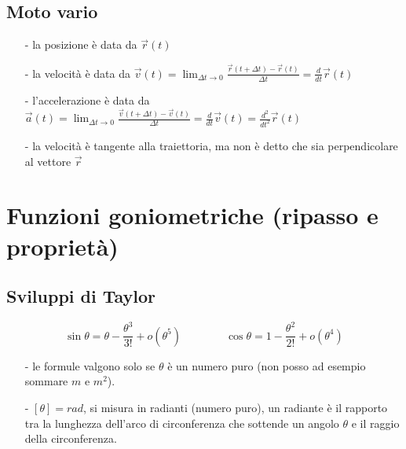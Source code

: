 \documentclass[a4paper]{article}
\begin{document}
\subsection{Moto vario}
\begin{itemize}[topsep=3pt, itemsep=0pt]
	\item[-] la posizione è data da \(\vec{r}(t)\)
	\item[-] la velocità è data da \(\displaystyle \vec{v}(t) = \lim_{\Delta t \to 0} \frac{\vec{r}(t+\Delta t) - \vec{r}(t)}{\Delta t} = \frac{d}{dt} \vec{r}(t)\)
	\item[-] l'accelerazione è data da \(\displaystyle \vec{a}(t) = \lim_{\Delta t \to 0} \frac{\vec{v}(t+\Delta t) - \vec{v}(t)}{\Delta t} = \frac{d}{dt} \vec{v}(t) = \frac{d^2}{dt^2} \vec{r}(t)\)
	\item[-] la velocità è tangente alla traiettoria, ma non è detto che sia perpendicolare al vettore \(\vec{r}\)
\end{itemize}

\newpage


\section{Funzioni goniometriche (ripasso e proprietà)}
\subsection{Sviluppi di Taylor}
\[\sin \theta = \theta - \frac{\theta^3}{3!} + o(\theta^5) \qquad \qquad \cos \theta = 1 - \frac{\theta^2}{2!} + o(\theta^4)\]
\begin{itemize}[topsep=3pt, itemsep=0pt]
	\item[-] le formule valgono solo se \(\theta\) è un numero puro (non posso ad esempio sommare \(m\) e \(m^2\)).
	\item[-] \(\left[\theta\right] = rad\), si misura in radianti (numero puro), un radiante è il rapporto tra la lunghezza dell'arco
	di circonferenza che sottende un angolo \(\theta\) e il raggio della circonferenza.
\end{itemize}
\end{document}

